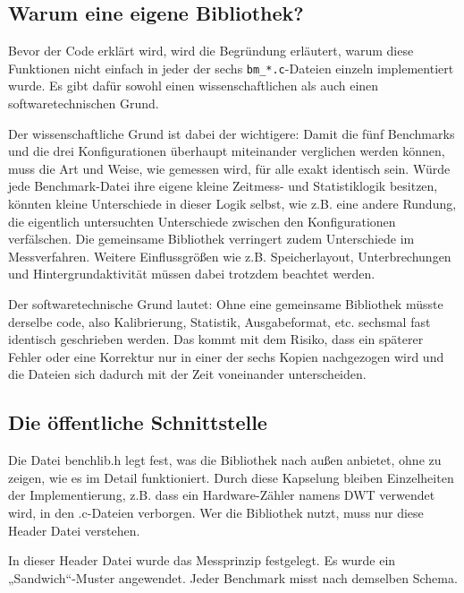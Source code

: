 \subsection{Warum eine eigene Bibliothek?}
Bevor der Code erklärt wird, wird die Begründung erläutert, warum diese Funktionen nicht einfach in jeder der sechs \lstinline[style=fileinline]|bm_*.c|-Dateien einzeln implementiert wurde. Es gibt dafür sowohl einen wissenschaftlichen als auch einen softwaretechnischen Grund.

Der wissenschaftliche Grund ist dabei der wichtigere: Damit die fünf Benchmarks und die drei Konfigurationen überhaupt miteinander verglichen werden können, muss die Art und Weise, wie gemessen wird, für alle exakt identisch sein. Würde jede Benchmark-Datei ihre eigene kleine Zeitmess- und Statistiklogik besitzen, könnten kleine Unterschiede in dieser Logik selbst, wie z.B. eine andere Rundung, die eigentlich untersuchten Unterschiede zwischen den Konfigurationen verfälschen. Die gemeinsame Bibliothek verringert zudem Unterschiede im Messverfahren. Weitere Einflussgrößen wie z.B. Speicherlayout, Unterbrechungen und Hintergrundaktivität müssen dabei trotzdem beachtet werden.

Der softwaretechnische Grund lautet: Ohne eine gemeinsame Bibliothek müsste derselbe code, also Kalibrierung, Statistik, Ausgabeformat, etc. sechsmal fast identisch geschrieben werden. Das kommt mit dem Risiko, dass ein späterer Fehler oder eine Korrektur nur in einer der sechs Kopien nachgezogen wird und die Dateien sich dadurch mit der Zeit voneinander unterscheiden.

\subsection{Die öffentliche Schnittstelle}
Die Datei benchlib.h legt fest, was die Bibliothek nach außen anbietet, ohne zu zeigen, wie es im Detail funktioniert. Durch diese Kapselung bleiben Einzelheiten der Implementierung, z.B. dass ein Hardware-Zähler namens DWT verwendet wird, in den .c-Dateien verborgen. Wer die Bibliothek nutzt, muss nur diese Header Datei verstehen.

In dieser Header Datei wurde das Messprinzip festgelegt. Es wurde ein „Sandwich“-Muster angewendet. Jeder Benchmark misst nach demselben Schema.

